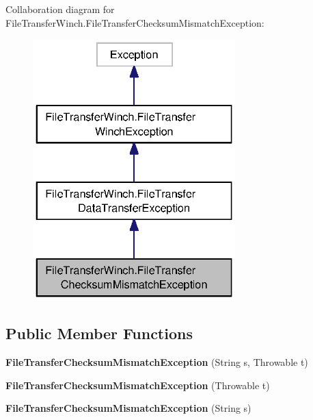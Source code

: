 Collaboration diagram for File\-Transfer\-Winch.\-File\-Transfer\-Checksum\-Mismatch\-Exception\-:\nopagebreak
\begin{figure}[H]
\begin{center}
\leavevmode
\includegraphics[width=222pt]{classorg_1_1smallfoot_1_1filexfer_1_1FileTransferWinch_1_1FileTransferChecksumMismatchException__coll__graph}
\end{center}
\end{figure}
\subsection*{Public Member Functions}
\begin{DoxyCompactItemize}
\item 
{\bfseries File\-Transfer\-Checksum\-Mismatch\-Exception} (String s, Throwable t)\label{classorg_1_1smallfoot_1_1filexfer_1_1FileTransferWinch_1_1FileTransferChecksumMismatchException_a68f39ff221119291117ba025fbaf6b48}

\item 
{\bfseries File\-Transfer\-Checksum\-Mismatch\-Exception} (Throwable t)\label{classorg_1_1smallfoot_1_1filexfer_1_1FileTransferWinch_1_1FileTransferChecksumMismatchException_a8c8c31fd8e685938b30b756523b56f09}

\item 
{\bfseries File\-Transfer\-Checksum\-Mismatch\-Exception} (String s)\label{classorg_1_1smallfoot_1_1filexfer_1_1FileTransferWinch_1_1FileTransferChecksumMismatchException_ae18c6b90199429c6b6b4dadd5f3f58ab}

\end{DoxyCompactItemize}


